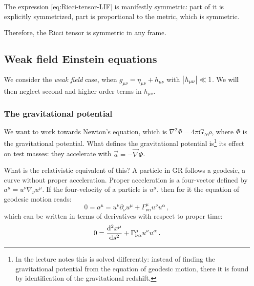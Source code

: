 \documentclass[main.tex]{subfiles}
\begin{document}
The expression \eqref{eq:Ricci-tensor-LIF} is manifestly symmetric: part of it is explicitly symmetrized, part is proportional to the metric, which is symmetric.

Therefore, the Ricci tensor is symmetric in any frame.

\subsection{Weak field Einstein equations}

We consider the \emph{weak field} case, when \(g_{\mu \nu }= \eta_{\mu \nu } + h_{\mu \nu }\) with \(\abs{h_{\mu \nu }} \ll 1 \). We will then neglect second and higher order terms in \(h_{\mu \nu }\).

\subsubsection{The gravitational potential}
\label{sec:weak-field-gravitational-potential}

We want to work towards Newton's equation, which is \(\nabla^2 \Phi = 4 \pi G_N \rho \), where \(\Phi \) is the gravitational potential.
What defines the gravitational potential is\footnote{In the lecture notes this is solved differently: instead of finding the gravitational potential from the equation of geodesic motion, there it is found by identification of the gravitational redshift.} its effect on test masses: they accelerate with \(\vec{a} = - \vec{\nabla} \Phi \).

What is the relativistic equivalent of this?
A particle in GR follows a geodesic, a curve without proper acceleration.
Proper acceleration is a four-vector defined by \(a^{\mu }=u^{\nu }\nabla_{\nu } u^{\mu }\). If the four-velocity of a particle is \(u^{\mu }\), then for it the equation of geodesic motion reads: 
%
\begin{equation}
  0 = a^{\mu }= u^{\nu }\partial_{\nu }u^{\mu } + \Gamma^{\mu }_{\nu \alpha }u^{\nu} u^{\alpha }
\,,
\end{equation}
%
which can be written in terms of derivatives with respect to proper time: 
%
\begin{equation}
  0 = \dv[2]{x^{ \mu }}{s} + \Gamma^{\mu }_{\nu \alpha } u^{\nu } u^{\alpha }
\,.
\end{equation}
\end{document}
